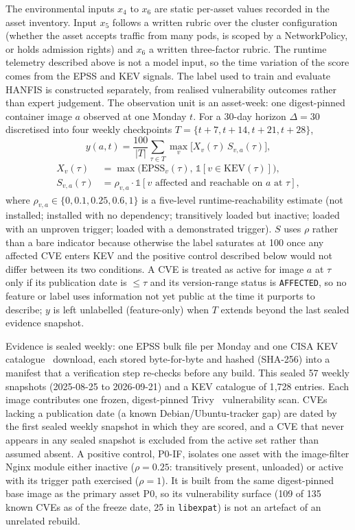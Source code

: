 \documentclass[referee,lineno,pdflatex,sn-basic]{sn-jnl}%
\theoremstyle{thmstyleone}%
\theoremstyle{thmstyletwo}%
\theoremstyle{thmstylethree}%
\begin{document}
The environmental inputs $x_4$ to $x_6$ are static per-asset values recorded in the asset inventory. Input $x_5$ follows a written rubric over the cluster configuration (whether the asset accepts traffic from many pods, is scoped by a NetworkPolicy, or holds admission rights) and $x_6$ a written three-factor rubric. The runtime telemetry described above is not a model input, so the time variation of the score comes from the EPSS and KEV signals. The label used to train and evaluate HANFIS is constructed separately, from realised vulnerability outcomes rather than expert judgement. The observation unit is an asset-week: one digest-pinned container image $a$ observed
at one Monday $t$. For a 30-day horizon $\Delta=30$ discretised into four weekly checkpoints
$T=\{t{+}7,t{+}14,t{+}21,t{+}28\}$,
\begin{equation}
y(a,t)=\frac{100}{|T|}\sum_{\tau\in T}\max_{v}\big[X_v(\tau)\,S_{v,a}(\tau)\big],
\end{equation}
\begin{equation}
\begin{aligned}
X_v(\tau)&=\max\big(\mathrm{EPSS}_v(\tau),\,\mathbb{1}[v\in\mathrm{KEV}(\tau)]\big),\\
S_{v,a}(\tau)&=\rho_{v,a}\cdot\mathbb{1}[v\text{ affected and reachable on }a\text{ at }\tau],
\end{aligned}
\end{equation}
where $\rho_{v,a}\in\{0,0.1,0.25,0.6,1\}$ is a five-level runtime-reachability estimate (not installed;
installed with no dependency; transitively loaded but inactive; loaded with an unproven trigger; loaded
with a demonstrated trigger). $S$ uses $\rho$ rather than a bare indicator because otherwise the label
saturates at 100 once any affected CVE enters KEV and the positive control described below would not
differ between its two conditions. A CVE is treated as active for image $a$ at $\tau$ only if its
publication date is $\le\tau$ and its version-range status is \texttt{AFFECTED}, so no feature or label
uses information not yet public at the time it purports to describe; $y$ is left unlabelled (feature-only)
when $T$ extends beyond the last sealed evidence snapshot.

Evidence is sealed weekly: one EPSS bulk file per Monday and one CISA KEV catalogue~\citep{cisa_kev} download, each stored byte-for-byte and hashed (SHA-256) into a manifest that a verification step re-checks before any build. This sealed 57 weekly snapshots (2025-08-25 to 2026-09-21) and a KEV catalogue of 1{,}728 entries. Each image contributes one frozen, digest-pinned Trivy~\citep{aqua_trivy} vulnerability scan. CVEs lacking a publication date (a known Debian/Ubuntu-tracker gap) are dated by the first sealed weekly snapshot in which they are scored, and a CVE that never appears in any sealed snapshot is excluded from the active set rather than assumed absent. A positive control, P0-IF, isolates one asset with the image-filter Nginx module either inactive ($\rho=0.25$: transitively present, unloaded) or active with its trigger path exercised ($\rho=1$). It is built from the same digest-pinned base image as the primary asset P0, so its vulnerability surface (109 of 135 known CVEs as of the freeze date, 25 in \texttt{libexpat}) is not an artefact of an unrelated rebuild.
\end{document}
